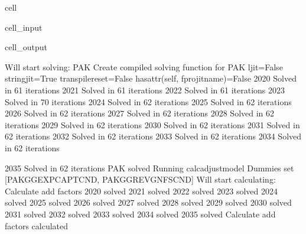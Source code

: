 \documentclass[letterpaper,10pt,english]{jupyterBook}
\begin{document}
\begin{sphinxuseclass}{cell}\begin{sphinxVerbatimInput}

\begin{sphinxuseclass}{cell_input}
\begin{sphinxVerbatim}[commandchars=\\\{\}]
   
\end{sphinxVerbatim}

\end{sphinxuseclass}\end{sphinxVerbatimInput}
\begin{sphinxVerbatimOutput}

\begin{sphinxuseclass}{cell_output}
\begin{sphinxVerbatim}[commandchars=\\\{\}]
Will start solving: PAK
Create compiled solving function for PAK
ljit=False stringjit=True  transpile\PYGZus{}reset=False  hasattr(self, f\PYGZdq{}pro\PYGZus{}\PYGZob{}jitname\PYGZcb{}\PYGZdq{})=False
2020 Solved in 61 iterations
2021 Solved in 61 iterations
2022 Solved in 61 iterations
2023 Solved in 70 iterations
2024 Solved in 62 iterations
2025 Solved in 62 iterations
2026 Solved in 62 iterations
2027 Solved in 62 iterations
2028 Solved in 62 iterations
2029 Solved in 62 iterations
2030 Solved in 62 iterations
2031 Solved in 62 iterations
2032 Solved in 62 iterations
2033 Solved in 62 iterations
2034 Solved in 62 iterations
\end{sphinxVerbatim}

\begin{sphinxVerbatim}[commandchars=\\\{\}]
2035 Solved in 62 iterations
PAK solved  
Running calc\PYGZus{}adjust\PYGZus{}model 
Dummies set [\PYGZsq{}PAKGGEXPCAPTCN\PYGZus{}D\PYGZsq{}, \PYGZsq{}PAKGGREVGNFSCN\PYGZus{}D\PYGZsq{}]
Will start calculating: Calculate add factors
2020  solved
2021  solved
2022  solved
2023  solved
2024  solved
2025  solved
2026  solved
2027  solved
2028  solved
2029  solved
2030  solved
2031  solved
2032  solved
2033  solved
2034  solved
2035  solved
Calculate add factors calculated 
\end{sphinxVerbatim}

\end{sphinxuseclass}\end{sphinxVerbatimOutput}

\end{sphinxuseclass}
\end{document}
